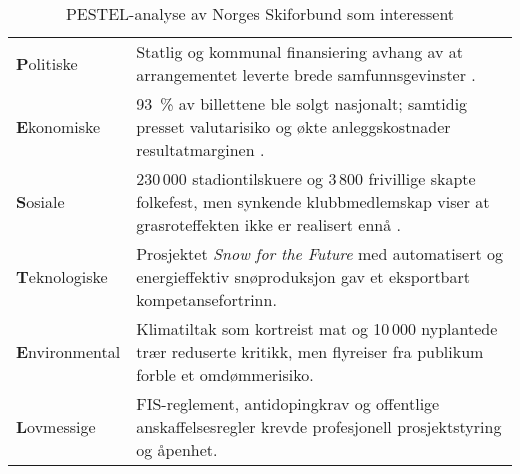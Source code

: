 \begin{table}[H]
    \centering
    \begin{tabular}{@{}p{2.7cm}p{10.2cm}@{}}
        \toprule                                                                                                                                                                                            \\ \midrule
        \textbf{P}olitiske     & Statlig og kommunal finansiering avhang av at arrangementet leverte brede samfunnsgevinster \parencite{TrondheimKommuneVM}.                                                     \\
        \textbf{E}konomiske    & 93~\% av billettene ble solgt nasjonalt; samtidig presset valutarisiko og økte anleggskostnader resultatmarginen \parencite{AdressaKjopefest}.                                  \\
        \textbf{S}osiale       & 230\,000 stadiontilskuere og 3\,800 frivillige skapte folkefest, men synkende klubbmedlemskap viser at grasroteffekten ikke er realisert ennå \parencite{Adresseavisen,OsloVM}. \\
        \textbf{T}eknologiske  & Prosjektet \textit{Snow for the Future} med automatisert og energieffektiv snøproduksjon gav et eksportbart kompetansefortrinn\parencite{Trondheim2025Sustainability}.          \\
        \textbf{E}nvironmental & Klimatiltak som kortreist mat og 10\,000 nyplantede trær reduserte kritikk, men flyreiser fra publikum forble et omdømmerisiko.                                            \\
        \textbf{L}ovmessige    & FIS-reglement, antidopingkrav og offentlige anskaffelsesregler krevde profesjonell prosjektstyring og åpenhet.                                                             \\ \bottomrule
    \end{tabular}
    \caption{PESTEL-analyse av Norges Skiforbund som interessent}
    \label{tab:skiforbundet}
\end{table}

